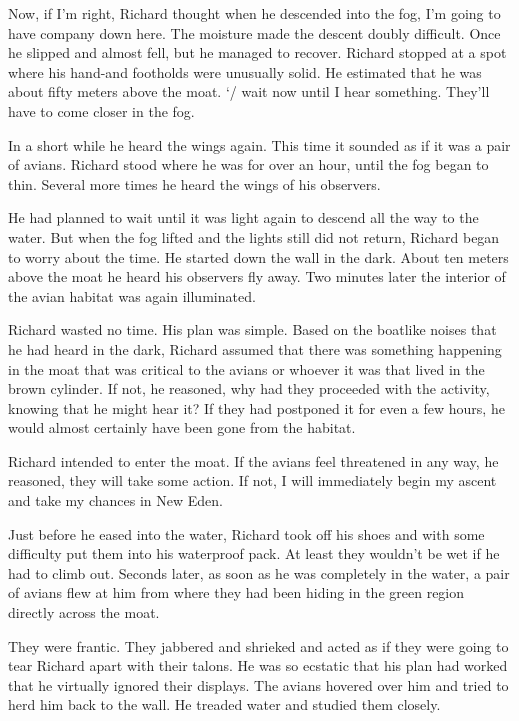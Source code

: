 \documentclass[]{article}
\begin{document}
{Now, if I’m right, Richard thought when he descended into the fog, I’m going to have company down here. The moisture made the descent doubly difficult. Once he slipped and almost fell, but he managed to recover. Richard stopped at a spot where his hand-and footholds were unusually solid. He estimated that he was about fifty meters above the moat. ‘/ wait now until I hear something. They’ll have to come closer in the fog.

In a short while he heard the wings again. This time it sounded as if it was a pair of avians. Richard stood where he was for over an hour, until the fog began to thin. Several more times he heard the wings of his observers.

He had planned to wait until it was light again to descend all the way to the water. But when the fog lifted and the lights still did not return, Richard began to worry about the time. He started down the wall in the dark. About ten meters above the moat he heard his observers fly away. Two minutes later the interior of the avian habitat was again illuminated.

Richard wasted no time. His plan was simple. Based on the boatlike noises that he had heard in the dark, Richard assumed that there was something happening in the moat that was critical to the avians or whoever it was that lived in the brown cylinder. If not, he reasoned, why had they proceeded with the activity, knowing that he might hear it? If they had postponed it for even a few hours, he would almost certainly have been gone from the habitat.

Richard intended to enter the moat. If the avians feel threatened in any way, he reasoned, they will take some action. If not, I will immediately begin my ascent and take my chances in New Eden.

Just before he eased into the water, Richard took off his shoes and with some difficulty put them into his waterproof pack. At least they wouldn’t be wet if he had to climb out. Seconds later, as soon as he was completely in the water, a pair of avians flew at him from where they had been hiding in the green region directly across the moat.

They were frantic. They jabbered and shrieked and acted as if they were going to tear Richard apart with their talons. He was so ecstatic that his plan had worked that he virtually ignored their displays. The avians hovered over him and tried to herd him back to the wall. He treaded water and studied them closely.

}
\end{document}
